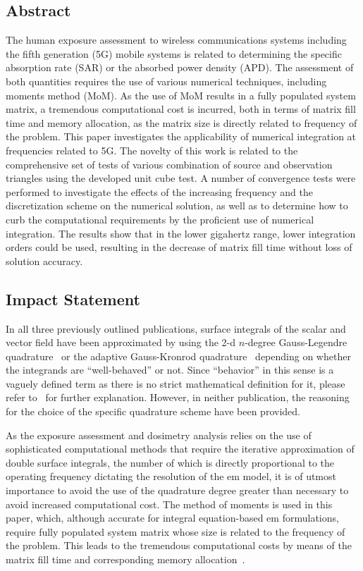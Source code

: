\subsection{Abstract}
The human exposure assessment to wireless communications systems including the fifth generation (5G) mobile systems is related to determining the specific absorption rate (SAR) or the absorbed power density (APD).
The assessment of both quantities requires the use of various numerical techniques, including moments method (MoM).
As the use of MoM results in a fully populated system matrix, a tremendous computational cost is incurred, both in terms of matrix fill time and memory allocation, as the matrix size is directly related to frequency of the problem.
This paper investigates the applicability of numerical integration at frequencies related to 5G.
The novelty of this work is related to the comprehensive set of tests of various combination of source and observation triangles using the developed unit cube test.
A number of convergence tests were performed to investigate the effects of the increasing frequency and the discretization scheme on the numerical solution, as well as to determine how to curb the computational requirements by the proficient use of numerical integration.
The results show that in the lower gigahertz range, lower integration orders could be used, resulting in the decrease of matrix fill time without loss of solution accuracy.

\subsection{Impact Statement}
In all three previously outlined publications, surface integrals of the scalar and vector field have been approximated by using the \gls{2-d} $n$-degree Gauss-Legendre quadrature~\cite{Abramowitz1972Handbook} or the adaptive Gauss-Kronrod quadrature~\cite{Piessens1983Quadpack} depending on whether the integrands are ``well-behaved'' or not.
Since ``behavior'' in this sense is a vaguely defined term as there is no strict mathematical definition for it, please refer to~\cite{Weisstein2023Pathological} for further explanation.
However, in neither publication, the reasoning for the choice of the specific quadrature scheme have been provided.

As the exposure assessment and dosimetry analysis relies on the use of sophisticated computational methods that require the iterative approximation of double surface integrals, the number of which is directly proportional to the operating frequency dictating the resolution of the \gls{em} model, it is of utmost importance to avoid the use of the quadrature degree greater than necessary to avoid increased computational cost.
The method of moments is used in this paper, which, although accurate for integral equation-based \gls{em} formulations, require fully populated system matrix whose size is related to the frequency of the problem.
This leads to the tremendous computational costs by means of the matrix fill time and corresponding memory allocation~\cite{Poljak2018conformal}.

